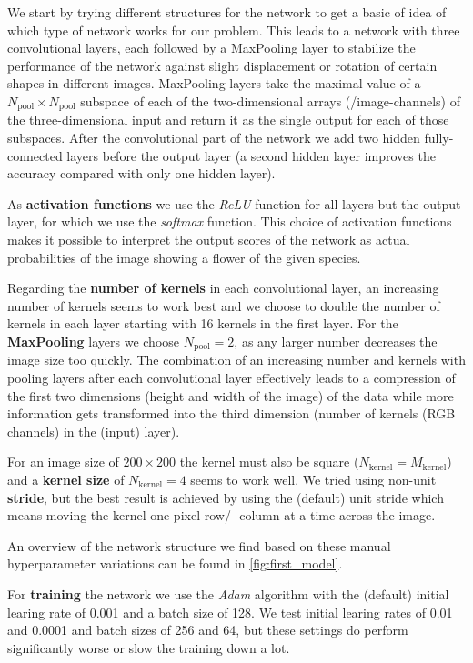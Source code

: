 We start by trying different structures for the network to get a basic of idea of which type of network works for our problem.
This leads to a network with three convolutional layers, each followed by a MaxPooling layer to stabilize the performance of the network against slight displacement or rotation of certain shapes 
in different images.
MaxPooling layers take the maximal value of a $N_\text{pool}\times N_\text{pool}$ subspace of each of the two-dimensional arrays (/image-channels) of the three-dimensional input and 
return it as the single output for each of those subspaces.
After the convolutional part of the network we add two hidden fully-connected layers before the output layer (a second hidden layer improves the accuracy compared with only one hidden layer).

As \textbf{activation functions} we use the \textit{ReLU} function for all layers but the output layer, for which we use the \textit{softmax} function.
This choice of activation functions makes it possible to interpret the output scores of the network as actual probabilities of the image showing a flower of the given species.

Regarding the \textbf{number of kernels} in each convolutional layer, an increasing number of kernels seems to work best and we choose to double the number of kernels in each layer
starting with 16 kernels in the first layer.
For the \textbf{MaxPooling} layers we choose $N_\text{pool} = 2$, as any larger number decreases the image size too quickly.
The combination of an increasing number and kernels with pooling layers after each convolutional layer effectively leads to a compression of the first two dimensions (height and width of the image) 
of the data while more information gets transformed into the third dimension (number of kernels (RGB channels) in the (input) layer).

For an image size of $200\times 200$ the kernel must also be square ($N_\text{kernel} = M_\text{kernel}$) and a \textbf{kernel size} of $N_\text{kernel} = 4$ seems to work well.
We tried using non-unit \textbf{stride}, but the best result is achieved by using the (default) unit stride which means moving the kernel one pixel-row/ -column at a time across the image.

An overview of the network structure we find based on these manual hyperparameter variations can be found in \autoref{fig:first_model}. 

For \textbf{training} the network we use the \textit{Adam} algorithm \cite{adam} with the (default) initial learing rate of 0.001 and a batch size of 128.
We test initial learing rates of 0.01 and 0.0001 and batch sizes of 256 and 64, but these settings do perform significantly worse or slow the training down a lot.


